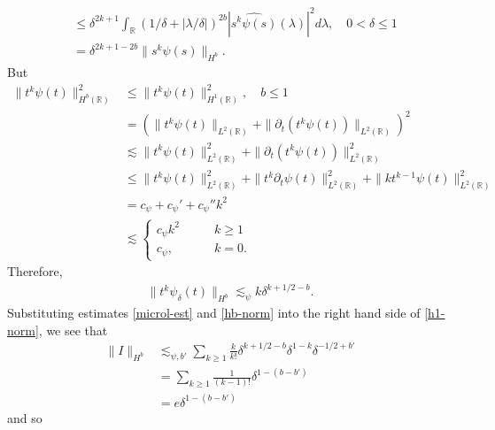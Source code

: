 \documentclass[12pt,reqno]{amsart}
\numberwithin{equation}{section}  %
\newcommand{\rr}{\mathbb{R}}
\newcommand{\wh}{\widehat}
\newcommand{\p}{\partial}
\begin{document}
\begin{appendices}
\begin{equation}
\begin{split}
  \\
  & \le \delta^{2k+1}
  \int_{\rr} \left( 1/\delta + | \lambda/\delta | \right)^{2b} | \wh{s^{k}
  \psi(s)}(\lambda )|^{2}  d \lambda, \quad 0 < \delta \le 1
  \\
  & = \delta^{2k +1 -2b} \| s^{k} \psi(s) \|_{H^{b}}.
\end{split}
\end{equation}
%
%
But
%
%
\begin{equation}
	\label{4ng}
	\begin{split}
		\|t^k \psi(t) \|_{H^b(\rr)}^2
    & \le \|t^k \psi(t) \|_{H^1(\rr)}^2, \quad b \le 1
		\\
    & = \left( \|t^k \psi(t)\|_{L^2(\rr)} + \|\p_t \left( t^k \psi(t)
		\right)\|_{L^2(\rr)} \right)^2
		\\
		& \lesssim \|t^{k}\psi(t) \|_{L^2(\rr)}^2 + \|\p_t \left (t^{k}
		\psi(t) \right )\|_{L^2(\rr)}^2
		\\
		& \le \|t^k \psi(t) \|_{L^2(\rr)}^2 + \|t^k \p_t \psi(t)
		\|_{L^2(\rr)}^2 + \|k t^{k -1} \psi(t) \|_{L^2(\rr)}^2
		\\
		& = c_{\psi} + c_{\psi}' + c_{\psi}''k^2 
		\\
    & \lesssim 
    \begin{cases}
      c_{\psi} k^2 \qquad  & k \ge 1
      \\
      c_{\psi}, \qquad & k = 0.
    \end{cases}
	\end{split}
\end{equation}
%
%
%
%
Therefore,
%
%
\begin{equation}
\begin{split}
  \| t^{k}\psi_{\delta}(t) \|_{H^b} \lesssim_{\psi}  k \delta^{k+1/2 -b}.
\end{split}
\label{hb-norm}
\end{equation}
%
%
Substituting estimates \eqref{microl-est} and \eqref{hb-norm} into the right
hand side of \eqref{h1-norm}, we see that
%
%
\begin{equation*}
\begin{split}
  \| I \|_{H^{b}}
  & \lesssim_{\psi, b'} \sum_{k \ge 1}\frac{k}{k!} \delta^{k + 1/2 -b}
  \delta^{1-k} \delta^{-1/2 + b'}
  \\
  & = \sum_{k \ge 1}\frac{1}{(k-1)!}\delta^{1 - (b - b')}
  \\
  & = e \delta^{1 - (b - b')}
\end{split}
\end{equation*}
%
%
and so
%
%
\begin{equation}

\end{equation}
\end{appendices}
\end{document}
